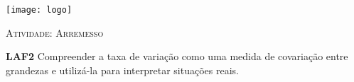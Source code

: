 \documentclass[10 pt,usenames,dvipsnames, oneside]{article}
\begin{document}
\begin{center}
  \begin{minipage}[l]{3cm}
\texttt{[image: logo]}    
\end{minipage}\hfill
\begin{minipage}[r]{.8\textwidth}
 {\Large \scshape Atividade: Arremesso}  
\end{minipage}
\end{center}
\vspace{.2cm}

\ifdefined\prof
\begin{objetivos}
\item \textbf{LAF2} Compreender a taxa de variação como uma medida de covariação entre grandezas e utilizá-la para interpretar situações reais.
\end{objetivos}
\end{document}
